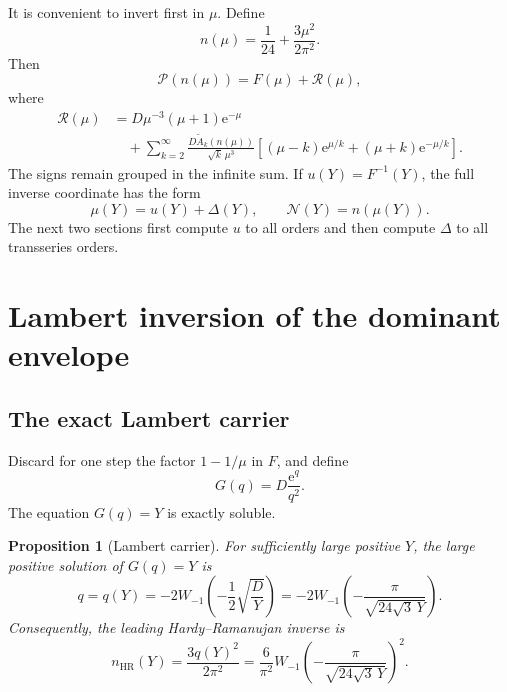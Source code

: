 \documentclass[11pt]{article}
\numberwithin{equation}{section}
\theoremstyle{mainthm}
\newtheorem{proposition}[theorem]{Proposition}
\theoremstyle{defstyle}
\theoremstyle{remark}
\newcommand{\e}{\mathrm e}
\newcommand{\Rtail}{\mathcal R}
\newcommand{\Pcal}{\mathcal P}
\newcommand{\Ncal}{\mathcal N}
\begin{document}
It is convenient to invert first in \(\mu\).  Define
\begin{equation}\label{eq:n-of-mu}
 n(\mu)=\frac1{24}+\frac{3\mu^2}{2\pi^2}.
\end{equation}
Then
\begin{equation}\label{eq:Pmu-decomposition}
 \Pcal(n(\mu))=F(\mu)+\Rtail(\mu),
\end{equation}
where
\begin{align}
 \Rtail(\mu)
 &=D\mu^{-3}(\mu+1)\e^{-\mu}\nonumber\\
 &\quad+\sum_{k=2}^{\infty}\frac{D\widetilde A_k(n(\mu))}{\sqrt{k}\,\mu^3}
 \left[(\mu-k)\e^{\mu/k}+(\mu+k)\e^{-\mu/k}\right].
 \label{eq:Rtail-def}
\end{align}
The signs remain grouped in the infinite sum.  If \(u(Y)=F^{-1}(Y)\), the full inverse coordinate has the form
\begin{equation}\label{eq:mu-full-inverse-form}
 \mu(Y)=u(Y)+\Delta(Y),
 \qquad
 \Ncal(Y)=n(\mu(Y)).
\end{equation}
The next two sections first compute \(u\) to all orders and then compute \(\Delta\) to all transseries orders.

\section{Lambert inversion of the dominant envelope}\label{sec:dominant-inverse}

\subsection{The exact Lambert carrier}

Discard for one step the factor \(1-1/\mu\) in \(F\), and define
\begin{equation}\label{eq:G-def}
 G(q)=D\frac{\e^q}{q^2}.
\end{equation}
The equation \(G(q)=Y\) is exactly soluble.

\begin{proposition}[Lambert carrier]\label{prop:Lambert-carrier}
For sufficiently large positive \(Y\), the large positive solution of \(G(q)=Y\) is
\begin{equation}\label{eq:q-def}
 \boxed{
 q=q(Y)=-2W_{-1}\!\left(-\frac12\sqrt{\frac DY}\right)
 =-2W_{-1}\!\left(-\frac{\pi}{\sqrt{24\sqrt3\,Y}}\right).}
\end{equation}
Consequently, the leading Hardy--Ramanujan inverse is
\begin{equation}\label{eq:leading-HR-inverse}
 n_{\mathrm{HR}}(Y)=\frac{3q(Y)^2}{2\pi^2}
 =\frac6{\pi^2}
 W_{-1}\!\left(-\frac{\pi}{\sqrt{24\sqrt3\,Y}}\right)^2.
\end{equation}
\end{proposition}
\end{document}

